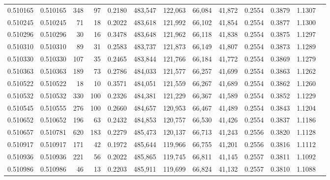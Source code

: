 \begin{tabular}{rrrrrrrrrrrrr}
0.510165 & 0.510165 &   348 &    97 &                                     0.2180 & 483,547 & 122,063 &  66,084 &  41,872 & 0.2554 & 0.3879 & 1.1307 \\
0.510245 & 0.510245 &    71 &    18 &                                     0.2022 & 483,618 & 121,992 &  66,102 &  41,854 & 0.2554 & 0.3877 & 1.1300 \\
0.510296 & 0.510296 &    30 &    16 &                                     0.3478 & 483,648 & 121,962 &  66,118 &  41,838 & 0.2554 & 0.3875 & 1.1297 \\
0.510310 & 0.510310 &    89 &    31 &                                     0.2583 & 483,737 & 121,873 &  66,149 &  41,807 & 0.2554 & 0.3873 & 1.1289 \\
0.510330 & 0.510330 &   107 &    35 &                                     0.2465 & 483,844 & 121,766 &  66,184 &  41,772 & 0.2554 & 0.3869 & 1.1279 \\
0.510363 & 0.510363 &   189 &    73 &                                     0.2786 & 484,033 & 121,577 &  66,257 &  41,699 & 0.2554 & 0.3863 & 1.1262 \\
0.510522 & 0.510522 &    18 &    10 &                                     0.3571 & 484,051 & 121,559 &  66,267 &  41,689 & 0.2554 & 0.3862 & 1.1260 \\
0.510532 & 0.510532 &   330 &   100 &                                     0.2326 & 484,381 & 121,229 &  66,367 &  41,589 & 0.2554 & 0.3852 & 1.1229 \\
0.510545 & 0.510555 &   276 &   100 &                                     0.2660 & 484,657 & 120,953 &  66,467 &  41,489 & 0.2554 & 0.3843 & 1.1204 \\
0.510652 & 0.510652 &   196 &    63 &                                     0.2432 & 484,853 & 120,757 &  66,530 &  41,426 & 0.2554 & 0.3837 & 1.1186 \\
0.510657 & 0.510781 &   620 &   183 &                                     0.2279 & 485,473 & 120,137 &  66,713 &  41,243 & 0.2556 & 0.3820 & 1.1128 \\
0.510917 & 0.510917 &   171 &    42 &                                     0.1972 & 485,644 & 119,966 &  66,755 &  41,201 & 0.2556 & 0.3816 & 1.1112 \\
0.510936 & 0.510936 &   221 &    56 &                                     0.2022 & 485,865 & 119,745 &  66,811 &  41,145 & 0.2557 & 0.3811 & 1.1092 \\
0.510986 & 0.510986 &    46 &    13 &                                     0.2203 & 485,911 & 119,699 &  66,824 &  41,132 & 0.2557 & 0.3810 & 1.1088 \\

\end{tabular}
